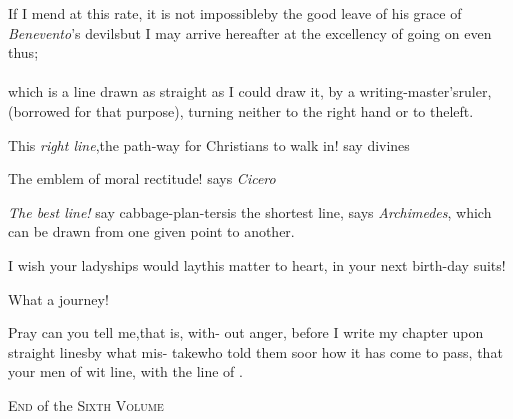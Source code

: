 \documentclass{article}
\begin{document}
If I mend at this rate, it is not impossible\tsh by the
good leave of his grace of \textit{Benevento}’s
devils\tsh but I may arrive hereafter at the excellency of\break
going on even thus;\\[10pt]
\\[10pt]
which is a line drawn as straight as I could draw
it, by a writing-master’s\break ruler, (borrowed for that purpose),
turning neither to the right hand or to the\break left.

This \textit{right line},\tsk the path-way for Christians to
walk in! say divines\tsh

\tsh The emblem of moral rectitude! says
\textit{Cicero}\tsh

\tsh \textit{The best line!} say cabbage-plan-\break ters\tsh is the shortest line,
says \textit{Archi\-medes},
which can be drawn from one given point to
another.\tsh

I wish your ladyships would lay\break this matter to heart, in your
next birth-\break day suits!

\tsh What a journey!

Pray can you tell me,\tsk that is, with-\break
out anger, before I write my chapter\break
upon straight lines\tsh by what mis-\break
take\tsh who told them so\tsh or how it\break
has come to pass, that your men of wit\break
{}\break
line, with the line of .

\bigskip
\centerline{\textsc{End} of the \textsc{Sixth Volume}}
\end{document}
